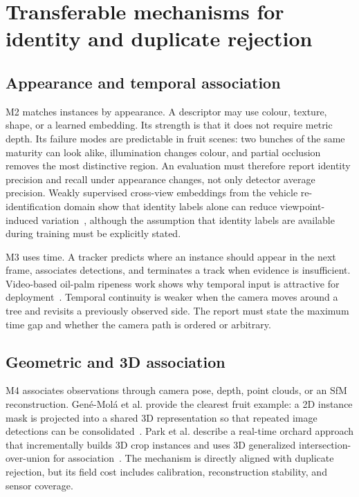 \section{Transferable mechanisms for identity and duplicate rejection}
\label{sec:transfer}

\subsection{Appearance and temporal association}

M2 matches instances by appearance. A descriptor may use colour, texture, shape, or a learned embedding. Its strength is that it does not require metric depth. Its failure modes are predictable in fruit scenes: two bunches of the same maturity can look alike, illumination changes colour, and partial occlusion removes the most distinctive region. An evaluation must therefore report identity precision and recall under appearance changes, not only detector average precision. Weakly supervised cross-view embeddings from the vehicle re-identification domain show that identity labels alone can reduce viewpoint-induced variation~\cite{ledger_r_4b3d8d423dbd5d0e}, although the assumption that identity labels are available during training must be explicitly stated.

M3 uses time. A tracker predicts where an instance should appear in the next frame, associates detections, and terminates a track when evidence is insufficient. Video-based oil-palm ripeness work shows why temporal input is attractive for deployment~\cite{junior2023videopalm}. Temporal continuity is weaker when the camera moves around a tree and revisits a previously observed side. The report must state the maximum time gap and whether the camera path is ordered or arbitrary.

\subsection{Geometric and 3D association}

M4 associates observations through camera pose, depth, point clouds, or an SfM reconstruction. Gené-Molá et al. provide the clearest fruit example: a 2D instance mask is projected into a shared 3D representation so that repeated image detections can be consolidated~\cite{genemola2020fruit3d}. Park et al. describe a real-time orchard approach that incrementally builds 3D crop instances and uses 3D generalized intersection-over-union for association~\cite{park2026cropassociation}. The mechanism is directly aligned with duplicate rejection, but its field cost includes calibration, reconstruction stability, and sensor coverage.


